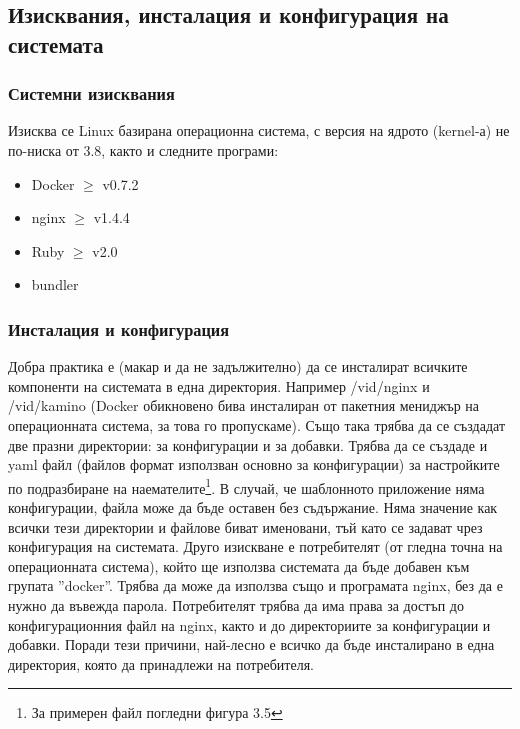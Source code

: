 \documentclass[pdftex,14pt,a4paper]{extreport}
\begin{document}
\subsection {Изисквания, инсталация и конфигурация на системата}
\subsubsection {Системни изисквания}
Изисква се Linux базирана операционна система, с версия на ядрото (kernel-а) не по-ниска от 3.8, както и следните програми:
\begin{itemize}
  \item Docker  $\ge$ v0.7.2
  \item nginx  $\ge$ v1.4.4
  \item Ruby   $\ge$ v2.0
  \item bundler
\end{itemize}
\subsubsection {Инсталация и конфигурация}
Добра практика е (макар и да не задължително) да се инсталират всичките компоненти на системата в една директория. Например /vid/nginx и /vid/kamino (Docker обикновено бива инсталиран от пакетния мениджър на операционната система, за това го пропускаме). Също така трябва да се създадат две празни директории: за конфигурации и за добавки. Трябва да се създаде и yaml файл (файлов формат използван основно за конфигурации) за настройките по подразбиране на наемателите\footnote{За примерен файл погледни фигура 3.5}. В случай, че шаблонното приложение няма конфигурации, файла може да бъде оставен без съдържание. Няма значение как всички тези директории и файлове биват именовани, тъй като се задават чрез конфигурация на системата. Друго изискване е потребителят (от гледна точна на операционната система), който ще използва системата да бъде добавен към групата ''docker''. Трябва да може да използва също и програмата nginx, без да е нужно да въвежда парола. Потребителят трябва да има права за достъп до конфигурационния файл на nginx, както и до директориите за конфигурации и добавки. Поради тези причини, най-лесно е всичко да бъде инсталирано в една директория, която да принадлежи на потребителя.
\end{document}
